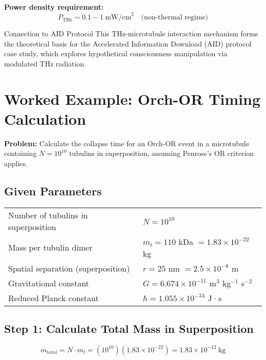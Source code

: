 \textbf{Power density requirement:}
\begin{equation}
\label{eq:power-density}
P_{\text{THz}} \sim 0.1-1~\text{mW/cm}^2 \quad \text{(non-thermal regime)}
\end{equation}

\begin{calloutbox}{Connection to AID Protocol}
This THz-microtubule interaction mechanism forms the theoretical basis for the Accelerated Information Download (AID) protocol case study, which explores hypothetical consciousness manipulation via modulated THz radiation.
\end{calloutbox}

\section{Worked Example: Orch-OR Timing Calculation}

\textbf{Problem:} Calculate the collapse time for an Orch-OR event in a microtubule containing $N = 10^{10}$ tubulins in superposition, assuming Penrose's OR criterion applies.

\subsection*{Given Parameters}

\begin{tabular}{@{}ll@{}}
Number of tubulins in superposition & $N = 10^{10}$ \\
Mass per tubulin dimer & $m_t = 110$ kDa $= 1.83 \times 10^{-22}$ kg \\
Spatial separation (superposition) & $r = 25$ nm $= 2.5 \times 10^{-8}$ m \\
Gravitational constant & $G = 6.674 \times 10^{-11}$ m$^3$ kg$^{-1}$ s$^{-2}$ \\
Reduced Planck constant & $\hbar = 1.055 \times 10^{-34}$ J·s \\
\end{tabular}

\subsection*{Step 1: Calculate Total Mass in Superposition}

\begin{equation}
m_{\text{total}} = N \cdot m_t = (10^{10})(1.83 \times 10^{-22}) = 1.83 \times 10^{-12}~\text{kg}
\end{equation}

